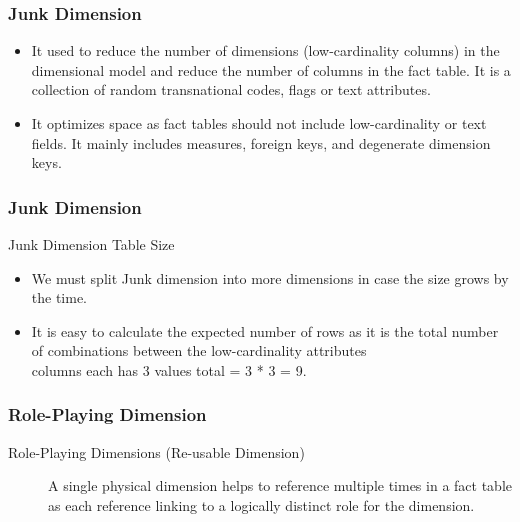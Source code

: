 \begin{frame}
    \frametitle{Junk Dimension}
	\begin{itemize}[<+->]
		\item It used to reduce the number of dimensions (low-cardinality columns) in the dimensional model and reduce the number of columns in the fact table. It is a collection of random transnational codes, flags or text attributes.
		\item It optimizes space as fact tables should not include low-cardinality or text fields. It mainly includes measures, foreign keys, and degenerate dimension keys.		
	\end{itemize}
    
\end{frame}
\begin{frame}
	\frametitle{Junk Dimension}

	\begin{block}{Junk Dimension Table Size}
		\begin{itemize}
			\item We must split Junk dimension into more dimensions in case the size grows by the time.
			\item It is easy to calculate the expected number of rows as it is the total number of combinations between the low-cardinality attributes \\ \faEdit \space \faArrowCircleORight {} columns each has 3 values total = 3 * 3 = 9.
		\end{itemize}
	\end{block}
	
\end{frame}
\begin{frame}
    \frametitle{Role-Playing Dimension}
    \begin{description}
        \item [Role-Playing Dimensions (Re-usable Dimension)] A single physical dimension helps to reference multiple times in a fact table as each reference linking to a logically distinct role for the dimension.
    \end{description}
    \centering
    
\end{frame}
